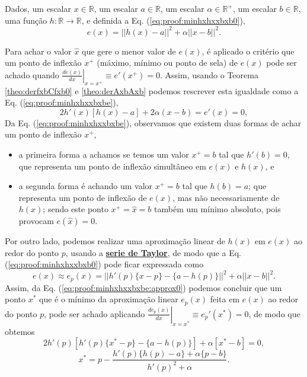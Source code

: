 \begin{myproofT}\label{proof:theo:minhxhxxbxb}

Dados,
um escalar $x \in \mathbb{R}$, 
um escalar $a \in \mathbb{R}$,
um escalar $\alpha \in \mathbb{R}^{+}$,
um escalar $b \in \mathbb{R}$,
uma função $h:\mathbb{R} \rightarrow \mathbb{R}$, e 
definida a Eq. (\ref{eq:proof:minhxhxxbxb0}),
\begin{equation}\label{eq:proof:minhxhxxbxb0}
e(x)=||h(x)-a||^2+\alpha ||x-b||^2.
\end{equation}

Para achar o valor  $\hat{x}$ que gere o menor valor de $e(x)$, é aplicado
o critério que um ponto de inflexão $x^+$ (máximo, mínimo ou ponto de sela) de $e(x)$ 
pode ser achado quando 
$\left. \frac{d e(x)}{d x }\right|_{x=x^+} \equiv e'(x^+) =0$.
Assim, 
usando o Teorema \ref{theo:derfxbCfxb0} e \ref{theo:derAxbAxb}  podemos 
rescrever esta igualdade como a Eq. (\ref{eq:proof:minhxhxxbxbe}),
\begin{equation}\label{eq:proof:minhxhxxbxbe}
2  h'(x) \left[h(x) -a\right]+2\alpha (x-b)= e'(x)=0,
\end{equation}
Da Eq. (\ref{eq:proof:minhxhxxbxbe}), observamos 
que existem duas formas de achar um ponto de inflexão $x^+$,
\begin{itemize}
 \item a primeira forma a achamos se temos um valor $x^+=b$ tal que $h'(b)=0$, 
que representa um ponto de inflexão simultâneo em $e(x)$ e $h(x)$, e
 \item a segunda forma é achando um valor $x^+=b$ tal que $h(b)=a$;
que representa um ponto de inflexão de $e(x)$, mas não
necessariamente de $h(x)$; 
sendo este ponto $x^+=\hat{x}=b$ também um mínimo absoluto, pois provocam $e(\hat{x})=0$.
\end{itemize}

Por outro lado, podemos realizar uma aproximação linear de $h(x)$ em $e(x)$
ao redor do ponto $p$, usando a \hyperref[def:taylor]{\textbf{serie de Taylor}},
de modo que a Eq. (\ref{eq:proof:minhxhxxbxb0}) pode ficar expressada como
\begin{equation}\label{eq:proof:minhxhxxbxbe:approx0}
e(x) \approx  e_p(x) = ||h'(p)\{x-p\}-\{a-h(p)\}||^2+\alpha ||x-b||^2.
\end{equation}
Assim, da Eq. (\ref{eq:proof:minhxhxxbxbe:approx0})
podemos concluir que um ponto $x^*$ que é 
o mínimo da aproximação linear $e_p(x)$ feita em $e(x)$ ao redor do ponto $p$,
pode ser achado aplicando $\left. \frac{d e_p(x)}{d x }\right|_{x=x^*} \equiv e_{p}'(x^*) =0$,
de modo que obtemos
\begin{equation}\label{eq:proof:minhxhxaxb2a}
 2 h'(p)[h'(p)\{x^*-p\} -\{a-h(p)\}] + \alpha [x^*-b] = 0,
\end{equation} 
\begin{equation}\label{eq:proof:minhxhxaxb2}
x^* = p - \frac{h'(p)\{h(p)-a\}+\alpha\{p-b\}}{ h'(p)^2+\alpha}.
\end{equation} 


\end{myproofT}
